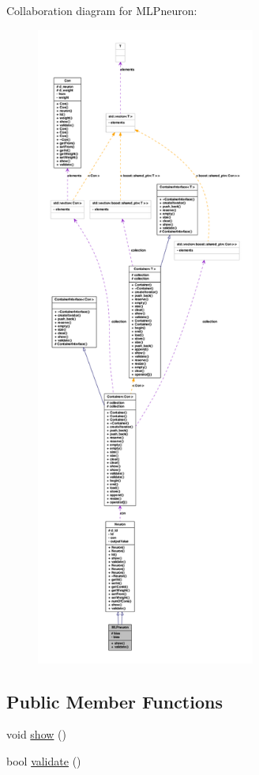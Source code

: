 Collaboration diagram for MLPneuron:
\nopagebreak
\begin{figure}[H]
\begin{center}
\leavevmode
\includegraphics[height=600pt]{class_m_l_pneuron__coll__graph}
\end{center}
\end{figure}
\subsection*{Public Member Functions}
\begin{DoxyCompactItemize}
\item 
void \hyperlink{class_m_l_pneuron_aecfc0e5950d92ebc30c303b9c88a5282}{show} ()
\item 
bool \hyperlink{class_m_l_pneuron_a0e926f568e38bba25c8a0de8ce5c693a}{validate} ()
\end{DoxyCompactItemize}
